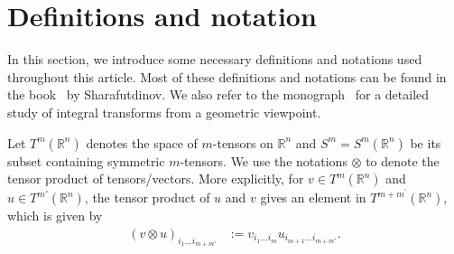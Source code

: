 \documentclass[11pt]{article}
\newcommand{\tblue}[1]{{\color{blue}{#1}}}
\newcommand{\Rb}{\mathbb{R}}
\begin{document}
\section{Definitions and notation}\label{sec:Def and notation}
In this section, we introduce some necessary definitions and notations used throughout this article. Most of these definitions and notations can be found in the book~\cite{Sharafutdinov_book} by Sharafutdinov. We also refer to the monograph~\cite{Gunther_Book} for a detailed study of integral transforms from a geometric viewpoint.

Let $T^m(\Rb^n)$ denotes the space of $m$-tensors on $\Rb^n$ and $S^m = S^m(\Rb^n)$ be its subset containing symmetric $m$-tensors.  
We use the notations $\otimes$ to denote the tensor product of tensors/vectors. More explicitly, for $v\in T^m(\mathbb{R}^n)$ and $u\in T^{m'}(\mathbb{R}^n)$, the tensor product of $u$ and $v$ gives an element in $T^{m+m^\prime}(\mathbb{R}^n)$, which is given by
\begin{align*}
    (v \otimes u)_{i_1\dots i_{m+m'}} &:=  v_{i_1\dots i_m}u_{i_{m+1}\dots i_{m+m'}}.
\end{align*}
\end{document}

